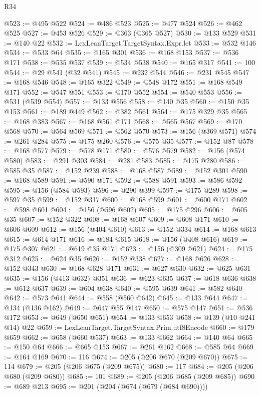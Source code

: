 \begin{lexlean}{R34}
\begin{coremodule}
@523 := @495 @522
@524 := @486 @523
@525 := @477 @524
@526 := @462 @525
@527 := @453 @526
@529 := @363 (@365 @527)
@530 := @133 @529
@531 := @140 @22
@532 := LexLeanTarget.TargetSyntax.Expr.let
@533 := @532 @146
@534 := @533 @64
@535 := @165 @301
@536 := @168 @153
@537 := @536 @171
@538 := @535 @537
@539 := @534 @538
@540 := @165 @317
@541 := 100
@544 := @29 @541 (@32 @541)
@545 := @232 @544
@546 := @231 @545
@547 := @168 @546
@548 := @165 @322
@549 := @548 @172
@551 := @168 @549 @171
@552 := @547 @551
@553 := @170 @552
@554 := @540 @553
@556 := @531 (@539 @554)
@557 := @133 @556
@558 := @140 @35
@560 := @150 @35 @153
@561 := @189 @449
@562 := @382 @561
@564 := @175 @329 @35
@565 := @168 @383
@567 := @168 @561 @171
@568 := @565 @567
@569 := @170 @568
@570 := @564 @569
@571 := @562 @570
@573 := @156 (@369 @571)
@574 := @261 @284
@575 := @175 @260
@576 := @575 @35
@577 := @152 @87
@578 := @168 @577
@579 := @578 @171
@580 := @576 @579
@582 := @156 (@574 @580)
@583 := @291 @303
@584 := @281 @583
@585 := @175 @280
@586 := @585 @35
@587 := @152 @239
@588 := @168 @587
@589 := @152 @301
@590 := @168 @589
@591 := @590 @171
@592 := @588 @591
@593 := @586 @592
@595 := @156 (@584 @593)
@596 := @290 @399
@597 := @175 @289
@598 := @597 @35
@599 := @152 @317
@600 := @168 @599
@601 := @600 @171
@602 := @598 @601
@604 := @156 (@596 @602)
@605 := @175 @296
@606 := @605 @35
@607 := @152 @322
@608 := @168 @607
@609 := @608 @171
@610 := @606 @609
@612 := @156 (@404 @610)
@613 := @152 @334
@614 := @168 @613
@615 := @614 @171
@616 := @184 @615
@618 := @156 (@408 @616)
@619 := @175 @307
@621 := @619 @35 @171
@623 := @156 (@309 @621)
@624 := @175 @312
@625 := @624 @35
@626 := @152 @338
@627 := @168 @626
@628 := @152 @343
@630 := @168 @628 @171
@631 := @627 @630
@632 := @625 @631
@635 := @156 (@413 @632) @351
@636 := @623 @635
@637 := @618 @636
@638 := @612 @637
@639 := @604 @638
@640 := @595 @639
@641 := @582 @640
@642 := @573 @641
@644 := @558 (@560 @642)
@645 := @133 @644
@647 := @134 (@136 @162)
@649 := @647 @55 @147
@650 := @575 @147
@651 := @536 @172
@653 := @649 (@650 @651)
@654 := @133 @653
@658 := @139 (@10 @241 @14) @22
@659 := LexLeanTarget.TargetSyntax.Prim.utf8Encode
@660 := @179 @659
@662 := @658 (@660 @537)
@663 := @133 @662
@664 := @140 @64
@665 := @150 @64
@666 := @665 @153
@667 := @261 @162
@668 := @585 @64
@669 := @164 @169
@670 := 116
@674 := @205 (@206 @670 (@209 @670))
@675 := 114
@679 := @205 (@206 @675 (@209 @675))
@680 := 117
@684 := @205 (@206 @680 (@209 @680))
@685 := 101
@689 := @205 (@206 @685 (@209 @685))
@690 := @689 @213
@695 := @201 (@204 (@674 (@679 (@684 @690))))

\end{coremodule}
\end{lexlean}
